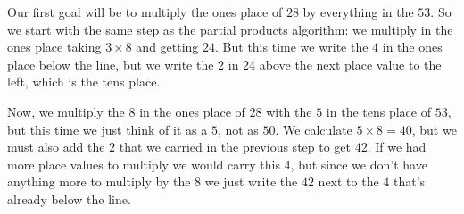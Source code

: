 \documentclass{ximera}
\begin{document}
Our first goal will be to multiply the ones place of $28$ by everything in the $53$. So we start with the same step as the partial products algorithm: we multiply in the ones place taking $3 \times 8$ and getting $24$. But this time we write the $4$ in the ones place below the line, but we write the $2$ in $24$ above the next place value to the left, which is the tens place.
\begin{image}
\end{image}

Now, we multiply the $8$ in the ones place of $28$ with the $5$ in the tens place of $53$, but this time we just think of it as a $5$, not as $50$. We calculate $5 \times 8 = 40$, but we must also add the $2$ that we carried in the previous step to get $42$. If we had more place values to multiply we would carry this $4$, but since we don't have anything more to multiply by the $8$ we just write the $42$ next to the $4$ that's already below the line.

\begin{image}
\end{image}
\end{document}
